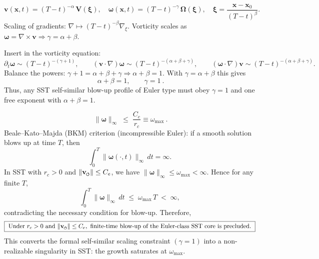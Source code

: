 \documentclass[10pt,reprint,aps,onecolumn,nofootinbib]{revtex4-2}
\newcommand{\vswirl}{\mathbf{v}_{\!\boldsymbol{\circlearrowleft}}}
\newcommand{\vnorm}{\lVert \mathbf{v}_{\mkern-2mu\scriptscriptstyle\boldsymbol{\circlearrowleft}} \rVert}               %
\begin{document}
%
    \[
        \mathbf{v}(\mathbf{x},t) = (T-t)^{-\alpha}\, \mathbf{V}\!\left(\boldsymbol{\xi}\right),\quad
        \boldsymbol{\omega}(\mathbf{x},t) = (T-t)^{-\gamma}\, \boldsymbol{\Omega}\!\left(\boldsymbol{\xi}\right),\quad
        \boldsymbol{\xi} = \frac{\mathbf{x}-\mathbf{x}_0}{(T-t)^{\beta}} .
    \]
    Scaling of gradients: \(\nabla \mapsto (T-t)^{-\beta}\nabla_{\!\xi}\).
    Vorticity scales as \(\boldsymbol{\omega}=\nabla\times\mathbf{v}\Rightarrow \gamma=\alpha+\beta\).

    Insert in the vorticity equation:
    \[
        \partial_t \boldsymbol{\omega}\sim (T-t)^{-(\gamma+1)},\qquad
        (\mathbf{v}\!\cdot\!\nabla)\boldsymbol{\omega}\sim (T-t)^{-(\alpha+\beta+\gamma)},\qquad
        (\boldsymbol{\omega}\!\cdot\!\nabla)\mathbf{v}\sim (T-t)^{-(\alpha+\beta+\gamma)} .
    \]
    Balance the powers: \(\gamma+1=\alpha+\beta+\gamma \Rightarrow \alpha+\beta=1\).
    With \(\gamma=\alpha+\beta\) this gives
    \[
        \boxed{\ \alpha+\beta=1,\qquad \gamma=1\ } .
    \]
    Thus, any SST self-similar blow-up profile of Euler type must obey \(\gamma=1\) and one free exponent with \(\alpha+\beta=1\).

    \[
        \boxed{\ \lVert \boldsymbol{\omega} \rVert_\infty \;\le\; \frac{C_e}{r_c} \equiv \omega_{\max}\ } .
    \]
    Beale–Kato–Majda (BKM) criterion (incompressible Euler): if a smooth solution blows up at time \(T\), then
    \[
        \int_0^T \lVert \boldsymbol{\omega}(\cdot,t) \rVert_\infty \, dt = \infty .
    \]
    In SST with \(r_c>0\) and \(\vnorm\le C_e\), we have \(\lVert \boldsymbol{\omega}\rVert_\infty\le \omega_{\max}<\infty\).
    Hence for any finite \(T\),
    \[
        \int_0^T \lVert \boldsymbol{\omega} \rVert_\infty \, dt \;\le\; \omega_{\max}\,T \;<\;\infty,
    \]
    contradicting the necessary condition for blow-up. Therefore,
    \[
        \boxed{\ \text{Under } r_c>0 \text{ and } \vnorm\le C_e,\ \text{finite-time blow-up of the Euler-class SST core is precluded.}\ }
    \]
    This converts the formal self-similar scaling constraint \((\gamma=1)\) into a non-realizable singularity in SST: the growth saturates at \(\omega_{\max}\).
\end{document}
